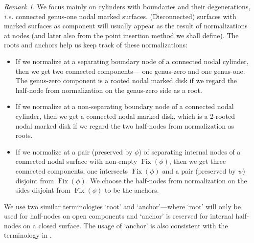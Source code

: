 \documentclass[11pt]{amsart}
\theoremstyle{definition}
\theoremstyle{remark}
\newtheorem{rmk}[dummy]{Remark}
\newcommand{\<}{\left<}
\renewcommand{\>}{\right>}
\numberwithin{equation}{section}
\begin{document}
\begin{rmk}\label{rmk root when degenerate}
We focus mainly on cylinders with boundaries and their degenerations, \textit{i.e.} connected genus-one nodal marked surfaces. (Disconnected) surfaces with marked surfaces as component will usually appear as the result of normalizations at nodes (and later also from the point insertion method we shall define). The roots and anchors help us keep track of these %
normalizations:
\begin{itemize}
    \item[-]  If we normalize at a separating boundary node of a connected nodal cylinder, %
then we get two %
connected components--- one %
genus-zero and one genus-one. The genus-zero component is a rooted nodal marked disk if we regard the half-node from normalization on the genus-zero side as a root.
    \item[-] If we normalize at a non-separating boundary node of a connected nodal cylinder, then we get a connected nodal marked disk, which is a 2-rooted nodal marked disk if we regard the two half-nodes from normalization as roots.
    \item[-]  If we normalize at a pair (preserved by $\phi$) of separating internal nodes of a connected nodal surface with non-empty $\operatorname{Fix}(\phi)$, then we get three connected components, one intersects $\operatorname{Fix}(\phi)$ and a pair (preserved by $\psi$) disjoint from $\operatorname{Fix}(\phi)$. We choose the half-nodes from normalization on the sides disjoint from $\operatorname{Fix}(\phi)$ to be the anchors.
\end{itemize}
We use two %
similar terminologies `root' and `anchor'---where `root' %
will only be used for half-nodes on open components and `anchor' is reserved for internal half-nodes on a closed surface. The usage of `anchor' is also consistent with the terminology in \cite{BCT1,BCT2,TZ1,TZ2}.

\end{rmk}
\end{document}
